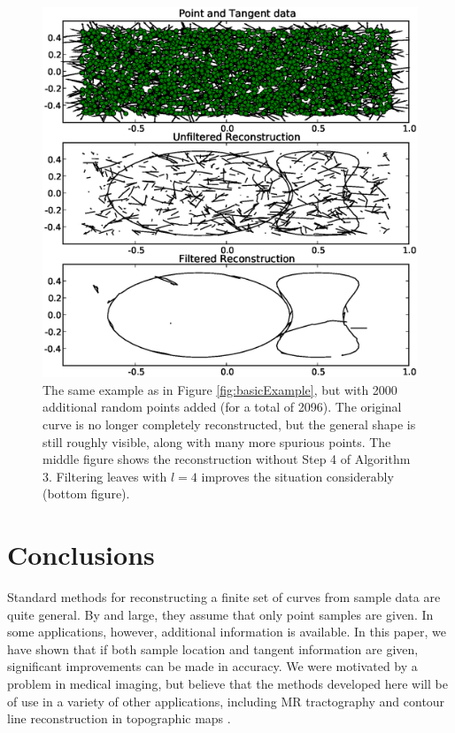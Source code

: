 \documentclass{article}
\numberwithin{cntr}{section}
\numberwithin{equation}{section}
\begin{document}
\begin{figure}
\setlength{\unitlength}{0.240900pt}
\ifx\plotpoint\undefined\newsavebox{\plotpoint}\fi
\sbox{\plotpoint}{\rule[-0.200pt]{0.400pt}{0.400pt}}%
\includegraphics[scale=0.5]{more_noisy_example.eps}
\caption{The same example as in Figure \ref{fig:basicExample}, but with
2000 additional random points added (for a total of 2096).
The original curve is no longer completely reconstructed, but the
general shape is still roughly visible, along with many more spurious
points. The middle figure shows the reconstruction
without Step 4 of Algorithm 3. Filtering leaves with $l=4$ improves
the situation considerably (bottom figure).
\label{fig:moreNoisyExample}}
\end{figure}

\section{Conclusions}

Standard methods for reconstructing a finite set of
curves from sample data are quite general.
By and large, they assume that only point samples are given.
In some applications, however, additional information is available.
In this paper, we have shown that if both sample location and
tangent information are given, significant improvements can be made
in accuracy. We were motivated by a problem in medical imaging,
but believe that
the methods developed here will be of use in a variety of other applications,
including MR tractography and contour line reconstruction in topographic
maps \cite{GORE,TOPO}.
\end{document}
